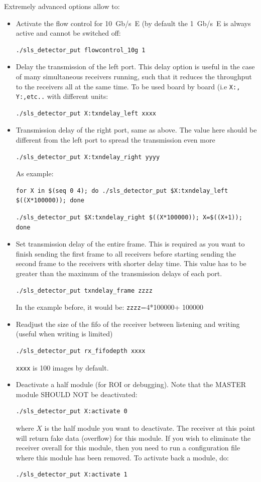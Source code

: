 \documentclass{article}
\begin{document}
Extremely advanced options allow to:
\begin{itemize}
\item Activate the flow control for 10~Gb/s~E (by default the 1~Gb/s~E is always active and cannot be switched off:
\begin{verbatim}
./sls_detector_put flowcontrol_10g 1
\end{verbatim}
\item  Delay the transmission of the left port. This delay option is useful in the case of many simultaneous receivers running, such that it reduces the throughput to the receivers all at the same time. To be used board by board (i.e {\tt{X:, Y:,etc..}} with different units:
\begin{verbatim}
./sls_detector_put X:txndelay_left xxxx 
\end{verbatim}
\item  Transmission delay of the right port, same as above. The value here should be different from the left port to spread the transmission even more 
\begin{verbatim}
./sls_detector_put X:txndelay_right yyyy
\end{verbatim}
As example:
\begin{verbatim}
for X in $(seq 0 4); do ./sls_detector_put $X:txndelay_left $((X*100000)); done
 \end{verbatim}
\begin{verbatim}
./sls_detector_put $X:txndelay_right $((X*100000)); X=$((X+1)); done
\end{verbatim}

\item Set transmission delay of the entire frame. This is required as you want to finish sending the first frame to all receivers before starting sending the second frame to the receivers with shorter delay time.  This value has to be greater than the maximum of the transmission delays of each port.      
\begin{verbatim}
./sls_detector_put txndelay_frame zzzz
\end{verbatim}
In the example before, it would be: {\tt{zzzz}}=4*100000+ 100000

\item Readjust the size of the fifo of the receiver between listening and writing (useful when writing is limited)
\begin{verbatim}
./sls_detector_put rx_fifodepth xxxx
\end{verbatim}
 {\tt{xxxx}} is 100 images by default.
\item Deactivate a half module (for ROI or debugging). Note that the MASTER module SHOULD NOT be deactivated:
\begin{verbatim}
./sls_detector_put X:activate 0 
\end{verbatim}
where $X$ is the half module you want to deactivate.
The receiver at this point will return fake data (overflow) for this module. If you wish to eliminate the receiver overall for this module, then you need to run a configuration file where this module has been removed.
To activate back a module, do:
\begin{verbatim}
./sls_detector_put X:activate 1
\end{verbatim}


\end{itemize}
\end{document}
